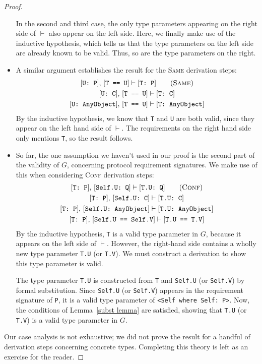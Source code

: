 \documentclass[../generics]{subfiles}
\begin{document}
\begin{proof}
\begin{itemize}
In the second and third case, the only type parameters appearing on the right side of $\vdash$ also appear on the left side. Here, we finally make use of the inductive hypothesis, which tells us that the type parameters on the left side are already known to be valid. Thus, so are the type parameters on the right.

\item
A similar argument establishes the result for the \textsc{Same} derivation steps:
\begin{gather*}
\ConfReq{U}{P},\,\FormalReq{T == U}\vdash\ConfReq{T}{P}\tag{\textsc{Same}}\\
\ConfReq{U}{C},\,\FormalReq{T == U}\vdash\ConfReq{T}{C}\\
\ConfReq{U}{AnyObject},\,\FormalReq{T == U}\vdash\ConfReq{T}{AnyObject}
\end{gather*}
By the inductive hypothesis, we know that \texttt{T} and \texttt{U} are both valid, since they appear on the left hand side of $\vdash$. The requirements on the right hand side only mentions \texttt{T}, so the result follows.

\item
So far, the one assumption we haven't used in our proof is the second part of the validity of $G$, concerning protocol requirement signatures. We make use of this when considering \textsc{Conf} derivation steps:
\begin{gather*}
\ConfReq{T}{P},\,\ConfReq{Self.U}{Q}\vdash\ConfReq{T.U}{Q}\tag{\textsc{Conf}}\\
\ConfReq{T}{P},\,\ConfReq{Self.U}{C}\vdash\ConfReq{T.U}{C}\\
\ConfReq{T}{P},\,\ConfReq{Self.U}{AnyObject}\vdash\ConfReq{T.U}{AnyObject}\\
\ConfReq{T}{P},\,\FormalReq{Self.U == Self.V}\vdash\FormalReq{T.U == T.V}
\end{gather*}
By the inductive hypothesis, \texttt{T} is a valid type parameter in $G$, because it appears on the left side of $\vdash$. However, the right-hand side contains a wholly new type parameter \texttt{T.U} (or \texttt{T.V}). We must construct a derivation to show this type parameter is valid.

The type parameter \texttt{T.U} is constructed from \texttt{T} and \texttt{Self.U} (or \texttt{Self.V}) by formal substitution. Since \texttt{Self.U} (or \texttt{Self.V}) appears in the requirement signature of \texttt{P}, it is a valid type parameter of \verb|<Self where Self: P>|. Now, the conditions of Lemma~\ref{subst lemma} are satisfied, showing that \texttt{T.U} (or \texttt{T.V}) is a valid type parameter in $G$.
\end{itemize}
Our case analysis is not exhaustive; we did not prove the result for a handful of derivation steps concerning concrete types. Completing this theory is left as an exercise for the reader.
\end{proof}
\end{document}
